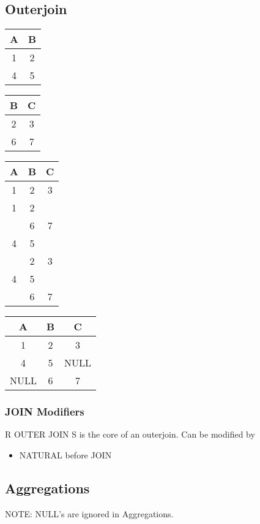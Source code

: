 \documentclass[12pt]{article}
\begin{document}
\subsection{Outerjoin}
\begin{tabular}{|c|c|}
  \hline
  A & B\\ 
  \hline
  1 & 2\\
  \hline
  4 & 5\\
  \hline
\end{tabular}
\begin{tabular}{|c|c|}
  \hline
  B & C\\ 
  \hline
  2 & 3\\
  \hline
  6 & 7\\
  \hline
\end{tabular}

\begin{tabular}{|c|c|c|}
  \hline
  A & B & C\\ 
  \hline
  1 & 2 & 3\\
  \hline
  1 & 2 &  \\
  \hline
    & 6 &  7\\
  \hline
  4 & 5 &  \\
  \hline
    & 2 & 3\\
  \hline
  4 & 5 &  \\
  \hline
    & 6 &  7\\
  \hline
\end{tabular}

\begin{tabular}{|c|c|c|}
  \hline
  A & B & C\\ 
  \hline
  1 & 2 & 3\\
  \hline
  4 & 5 & NULL\\
  \hline
  NULL & 6 & 7\\
  \hline
\end{tabular}

\subsubsection{JOIN Modifiers}
R OUTER JOIN S is the core of an outerjoin. Can be modified by
\begin{itemize}
    \item{NATURAL before JOIN}
\end{itemize}

\subsection{Aggregations}
NOTE: NULL's are ignored in Aggregations.
\end{document}
